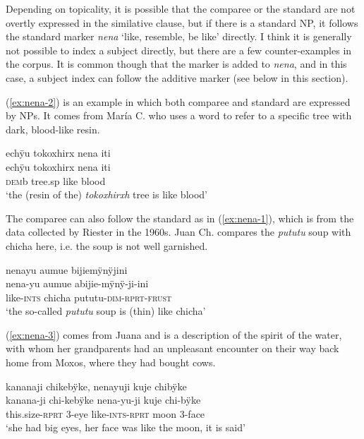 Depending on topicality, it is possible that the comparee or the standard are not overtly expressed in the similative clause, but if there is a standard NP, it follows the standard marker \textit{nena} ‘like, resemble, be like’ directly. I think it is generally not possible to index a subject directly, but there are a few counter-examples in the corpus. It is common though that the  marker is added to \textit{nena}, and in this case, a subject index can follow the additive marker (see below in this section).

(\ref{ex:nena-2}) is an example in which both comparee and standard are expressed by NPs. It comes from María C. who uses a  word to refer to a specific tree with dark, blood-like resin.

\ea\label{ex:nena-2}
\begingl 
\glpreamble echÿu tokoxhirx nena iti\\
\gla echÿu tokoxhirx nena iti\\ 
\glb \textsc{dem}b tree.sp like blood\\ 
\glft ‘the (resin of the) \textit{tokoxhirxh} tree is like blood’
\trailingcitation{[ump-p110815sf.366]}
\xe

The comparee can also follow the standard as in (\ref{ex:nena-1}), which is from the data collected by Riester in the 1960s. Juan Ch. compares the \textit{pututu} soup with chicha here, i.e. the soup is not well garnished.

\ea\label{ex:nena-1}
\begingl 
\glpreamble nenayu aumue bijiemÿnÿjini\\
\gla nena-yu aumue abijie-mÿnÿ-ji-ini\\ 
\glb like-\textsc{ints} chicha pututu-\textsc{dim}-\textsc{rprt}-\textsc{frust}\\ 
\glft ‘the so-called \textit{pututu} soup is (thin) like chicha’
\trailingcitation{[nxx-p630101g-2.58]}
\xe

(\ref{ex:nena-3}) comes from Juana and is a description of the spirit of the water, with whom her grandparents had an unpleasant encounter on their way back home from Moxos, where they had bought cows.

\ea\label{ex:nena-3}
\begingl
\glpreamble kananaji chikebÿke, nenayuji kuje chibÿke\\
\gla kanana-ji chi-kebÿke nena-yu-ji kuje chi-bÿke\\
\glb this.size-\textsc{rprt} 3-eye like-\textsc{ints}-\textsc{rprt} moon 3-face\\
\glft ‘she had big eyes, her face was like the moon, it is said’
\endgl
\trailingcitation{[jxx-p151016l-2.091]}
\xe

